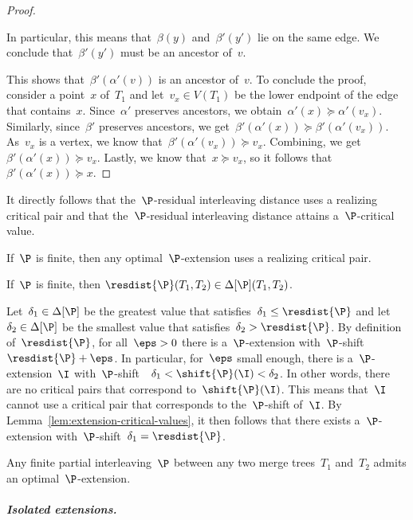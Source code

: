 \begin{proof}
\begin{itemize}
            In particular, this means that~$\beta(y)$ and~$\beta'(y')$ lie on the same edge.
            We conclude that~$\beta'(y')$ must be an ancestor of~$v$.
	\end{itemize}
%
    \noindent
    This shows that~$\beta'(\alpha'(v))$ is an ancestor of~$v$.
    To conclude the proof, consider a point~$x$ of~$T_1$ and let~$v_x \in V(T_1)$ be the lower endpoint of the edge that contains~$x$.
	Since~$\alpha'$ preserves ancestors, we obtain~$\alpha'(x) \succeq \alpha'(v_x)$.
	Similarly, since~$\beta'$ preserves ancestors, we get~$\beta'(\alpha'(x)) \succeq \beta'(\alpha'(v_x))$.
	As~$v_x$ is a vertex, we know that~$\beta'(\alpha'(v_x)) \succeq v_x$.
	Combining, we get~$\beta'(\alpha'(x)) \succeq v_x$.
	Lastly, we know that~$x \succeq v_x$, so it follows that~$\beta'(\alpha'(x)) \succeq x$.
\end{proof}
%
\noindent
It directly follows that the~$\P$-residual interleaving distance uses a realizing critical pair and that the~$\P$-residual interleaving distance attains a~$\P$-critical value.
%
\begin{corollary}\label{cor:using-critical-pair}
    If~$\P$ is finite, then any optimal~$\P$-extension uses a realizing critical pair.
\end{corollary}
%
\begin{corollary}\label{cor:critical-values}
	If~$\P$ is finite, then $\resdist{\P}(T_1, T_2) \in \Delta[\P](T_1, T_2)$.
\end{corollary}
%
\noindent
Let~$\delta_1 \in \Delta[\P]$ be the greatest value that satisfies~$\delta_1 \le \resdist{\P}$ and let~$ \delta_2 \in \Delta[\P]$ be the smallest value that satisfies~$\delta_2 > \resdist{\P}$.
By definition of~$\resdist{\P}$, for all~$\eps > 0$ there is a~$\P$-extension with~$\P$-shift~$\resdist{\P} + \eps$.
In particular, for~$\eps$ small enough, there is a~$\P$-extension~$\I$ with~$\P$-shift~~$\delta_1 < \shift{\P}(\I) < \delta_2$.
In other words, there are no critical pairs that correspond to~$\shift{\P}(\I)$. 
This means that~$\I$ cannot use a critical pair that corresponds to the~$\P$-shift of~$\I$.
By Lemma~\ref{lem:extension-critical-values}, it then follows that there exists a~$\P$-extension with~$\P$-shift~$\delta_1 = \resdist{\P}$.
%
\begin{theorem}\label{thm:existence-optimal-extension}
	Any finite partial interleaving~$\P$ between any two merge trees~$T_1$ and~$T_2$ admits an optimal~$\P$-extension.
\end{theorem}
%
\subparagraph{Isolated extensions.}
